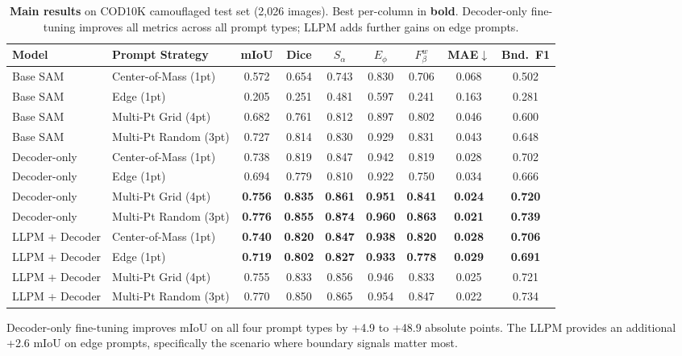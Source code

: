 \begin{table}[t]
\centering
\caption{\textbf{Main results} on COD10K camouflaged test set (2,026 images). Best per-column in \textbf{bold}. Decoder-only fine-tuning improves all metrics across all prompt types; LLPM adds further gains on edge prompts.}
\label{tab:main}
\small
\begin{tabular}{llccccccc}
\toprule
Model & Prompt Strategy & mIoU & Dice & $S_\alpha$ & $E_\phi$ & $F_\beta^w$ & MAE$\downarrow$ & Bnd.~F1 \\
\midrule
Base SAM & Center-of-Mass (1pt) & 0.572 & 0.654 & 0.743 & 0.830 & 0.706 & 0.068 & 0.502 \\
Base SAM & Edge (1pt) & 0.205 & 0.251 & 0.481 & 0.597 & 0.241 & 0.163 & 0.281 \\
Base SAM & Multi-Pt Grid (4pt) & 0.682 & 0.761 & 0.812 & 0.897 & 0.802 & 0.046 & 0.600 \\
Base SAM & Multi-Pt Random (3pt) & 0.727 & 0.814 & 0.830 & 0.929 & 0.831 & 0.043 & 0.648 \\
\midrule
Decoder-only & Center-of-Mass (1pt) & 0.738 & 0.819 & 0.847 & 0.942 & 0.819 & 0.028 & 0.702 \\
Decoder-only & Edge (1pt) & 0.694 & 0.779 & 0.810 & 0.922 & 0.750 & 0.034 & 0.666 \\
Decoder-only & Multi-Pt Grid (4pt) & \textbf{0.756} & \textbf{0.835} & \textbf{0.861} & \textbf{0.951} & \textbf{0.841} & \textbf{0.024} & \textbf{0.720} \\
Decoder-only & Multi-Pt Random (3pt) & \textbf{0.776} & \textbf{0.855} & \textbf{0.874} & \textbf{0.960} & \textbf{0.863} & \textbf{0.021} & \textbf{0.739} \\
\midrule
LLPM + Decoder & Center-of-Mass (1pt) & \textbf{0.740} & \textbf{0.820} & \textbf{0.847} & \textbf{0.938} & \textbf{0.820} & \textbf{0.028} & \textbf{0.706} \\
LLPM + Decoder & Edge (1pt) & \textbf{0.719} & \textbf{0.802} & \textbf{0.827} & \textbf{0.933} & \textbf{0.778} & \textbf{0.029} & \textbf{0.691} \\
LLPM + Decoder & Multi-Pt Grid (4pt) & 0.755 & 0.833 & 0.856 & 0.946 & 0.833 & 0.025 & 0.721 \\
LLPM + Decoder & Multi-Pt Random (3pt) & 0.770 & 0.850 & 0.865 & 0.954 & 0.847 & 0.022 & 0.734 \\
\bottomrule
\end{tabular}
\end{table}

Decoder-only fine-tuning improves mIoU on all four prompt types by +4.9 to +48.9 absolute points. The LLPM provides an additional +2.6 mIoU on edge prompts, specifically the scenario where boundary signals matter most.

